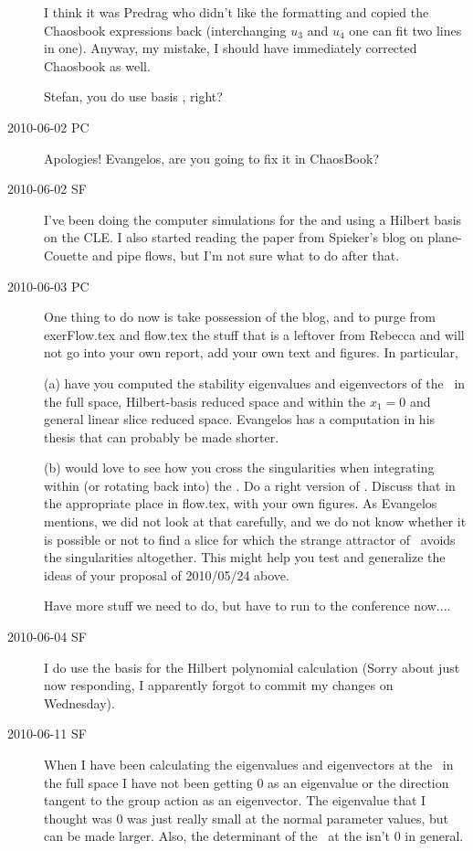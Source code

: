 \begin{description}
I think it was Predrag who didn't like the formatting and copied
the Chaosbook expressions back (interchanging $u_3$ and $u_4$ one
can fit two lines in one). Anyway, my mistake, I should have immediately
corrected Chaosbook as well.

Stefan, you do use basis , right?

\item[2010-06-02 PC] Apologies! Evangelos, are you going to fix it in ChaosBook?

\item[2010-06-02 SF]
I've been doing the computer simulations for the {\mslices}
and using a Hilbert basis on the CLE. I also started reading the paper from
Spieker's blog on plane-Couette and pipe flows, but I'm not sure what to do
after that.

\item[2010-06-03 PC]
One thing to do now is take possession of the blog,
and to purge from exerFlow.tex and flow.tex the stuff
that is a leftover from Rebecca and will not go into your own report,
add your own text and figures. In particular,

(a) have you computed the
stability eigenvalues and eigenvectors of the \reqv\ in
the full space, Hilbert-basis reduced space and within the $x_1=0$ and
general linear slice reduced space. Evangelos has a computation in his thesis
that can probably be made shorter.

(b) would love to see how you cross the singularities when integrating
within (or rotating back into) the \reducedsp. Do a right version
of . Discuss that in the appropriate
place in flow.tex, with your own figures. As Evangelos mentions, we
did not look at that carefully, and we do not know whether it is
possible or not to find a slice for which the strange attractor
of \cLe\ avoids the singularities altogether.
This might help you test and generalize the ideas
of your proposal of 2010/05/24 above.

Have more stuff we need to do, but have to run to the conference now....

\item[2010-06-04 SF]
I do use the basis  for the Hilbert polynomial calculation (Sorry about just now responding, I apparently forgot to commit my changes on Wednesday).

\item[2010-06-11 SF] When I have been calculating the eigenvalues and
eigenvectors at the \reqv\ in the full space I have not been getting 0 as
an eigenvalue or the direction tangent to the group action as an
eigenvector. The eigenvalue that I thought was 0 was just really small at
the normal parameter values, but can be made larger. Also, the
determinant of the \stabmat\ at the {\reqv} isn't 0 in general.


\end{description}
